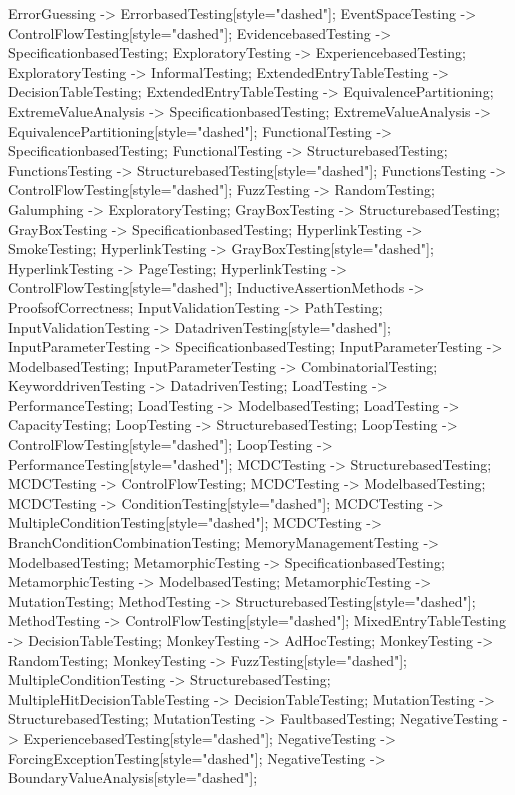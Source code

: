 \documentclass{article}
\begin{document}
{ErrorGuessing -> ErrorbasedTesting[style="dashed"];
EventSpaceTesting -> ControlFlowTesting[style="dashed"];
EvidencebasedTesting -> SpecificationbasedTesting;
ExploratoryTesting -> ExperiencebasedTesting;
ExploratoryTesting -> InformalTesting;
ExtendedEntryTableTesting -> DecisionTableTesting;
ExtendedEntryTableTesting -> EquivalencePartitioning;
ExtremeValueAnalysis -> SpecificationbasedTesting;
ExtremeValueAnalysis -> EquivalencePartitioning[style="dashed"];
FunctionalTesting -> SpecificationbasedTesting;
FunctionalTesting -> StructurebasedTesting;
FunctionsTesting -> StructurebasedTesting[style="dashed"];
FunctionsTesting -> ControlFlowTesting[style="dashed"];
FuzzTesting -> RandomTesting;
Galumphing -> ExploratoryTesting;
GrayBoxTesting -> StructurebasedTesting;
GrayBoxTesting -> SpecificationbasedTesting;
HyperlinkTesting -> SmokeTesting;
HyperlinkTesting -> GrayBoxTesting[style="dashed"];
HyperlinkTesting -> PageTesting;
HyperlinkTesting -> ControlFlowTesting[style="dashed"];
InductiveAssertionMethods -> ProofsofCorrectness;
InputValidationTesting -> PathTesting;
InputValidationTesting -> DatadrivenTesting[style="dashed"];
InputParameterTesting -> SpecificationbasedTesting;
InputParameterTesting -> ModelbasedTesting;
InputParameterTesting -> CombinatorialTesting;
KeyworddrivenTesting -> DatadrivenTesting;
LoadTesting -> PerformanceTesting;
LoadTesting -> ModelbasedTesting;
LoadTesting -> CapacityTesting;
LoopTesting -> StructurebasedTesting;
LoopTesting -> ControlFlowTesting[style="dashed"];
LoopTesting -> PerformanceTesting[style="dashed"];
MCDCTesting -> StructurebasedTesting;
MCDCTesting -> ControlFlowTesting;
MCDCTesting -> ModelbasedTesting;
MCDCTesting -> ConditionTesting[style="dashed"];
MCDCTesting -> MultipleConditionTesting[style="dashed"];
MCDCTesting -> BranchConditionCombinationTesting;
MemoryManagementTesting -> ModelbasedTesting;
MetamorphicTesting -> SpecificationbasedTesting;
MetamorphicTesting -> ModelbasedTesting;
MetamorphicTesting -> MutationTesting;
MethodTesting -> StructurebasedTesting[style="dashed"];
MethodTesting -> ControlFlowTesting[style="dashed"];
MixedEntryTableTesting -> DecisionTableTesting;
MonkeyTesting -> AdHocTesting;
MonkeyTesting -> RandomTesting;
MonkeyTesting -> FuzzTesting[style="dashed"];
MultipleConditionTesting -> StructurebasedTesting;
MultipleHitDecisionTableTesting -> DecisionTableTesting;
MutationTesting -> StructurebasedTesting;
MutationTesting -> FaultbasedTesting;
NegativeTesting -> ExperiencebasedTesting[style="dashed"];
NegativeTesting -> ForcingExceptionTesting[style="dashed"];
NegativeTesting -> BoundaryValueAnalysis[style="dashed"];
}
\end{document}
